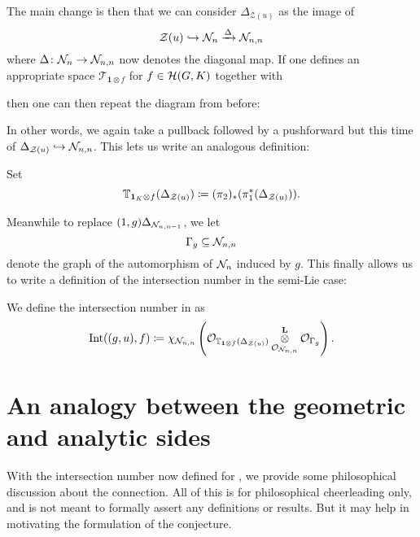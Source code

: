 The main change is then that we can consider $\Delta_{\mathcal Z(u)}$ as the image of
\[ \mathcal Z(u) \hookrightarrow \mathcal N_n \xrightarrow{\Delta} \mathcal N_{n,n} \]
where $\Delta \colon \mathcal N_n \to \mathcal N_{n,n}$ now denotes the diagonal map.
If one defines an appropriate space $\mathcal T_{\mathbf{1} \otimes f}$ for $f \in \mathcal H(G, K)$ together with
\begin{center}
\end{center}
then one can then repeat the diagram from before:
\begin{center}
\end{center}
In other words, we again take a pullback followed by a pushforward
but this time of $\Delta_{\mathcal Z(u)} \hookrightarrow \mathcal N_{n,n}$.
This lets us write an analogous definition:
\begin{definition}
  Set
  \[
    \mathbb T_{\mathbf{1}_K \otimes f} (\Delta_{\mathcal Z(u)})
    \coloneqq (\pi_2)_\ast(\pi_1^\ast(\Delta_{\mathcal Z(u)})).
  \]
\end{definition}
Meanwhile to replace $(1,g) \Delta_{\mathcal N_{n,n-1}}$, we let
\[ \Gamma_g \subseteq \mathcal N_{n,n} \]
denote the graph of the automorphism of $\mathcal N_n$ induced by $g$.
This finally allows us to write a definition of the intersection number in the semi-Lie case:
\begin{definition}
  We define the intersection number in  as
  \[
    \operatorname{Int}((g,u), f)
    \coloneqq \chi_{\mathcal N_{n,n}} \left(
      \mathcal{O}_{\mathbb T_{\mathbf{1} \otimes f}(\Delta_{\mathcal Z(u)})}
      \mathop{\otimes}^{\mathbf{L}}_{\mathcal{O}_{\mathcal N_{n,n}}} \mathcal{O}_{\Gamma_g} \right).
  \]
  \label{def:intersection_number_semi_lie_spherical}
\end{definition}

\section{An analogy between the geometric and analytic sides}
With the intersection number now defined for ,
we provide some philosophical discussion about the connection.
All of this is for philosophical cheerleading only,
and is not meant to formally assert any definitions or results.
But it may help in motivating the formulation of the conjecture.

